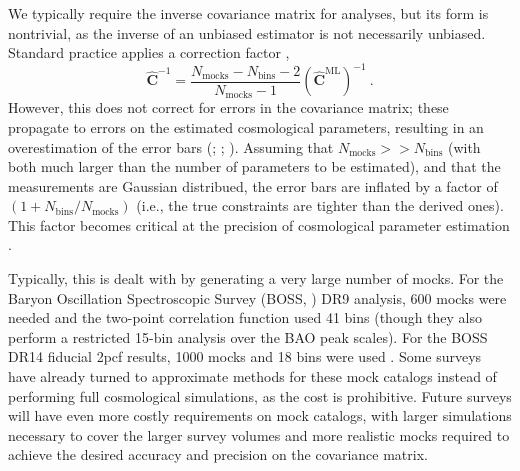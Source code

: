 \documentclass[modern]{aastex62}
\newcommand{\cf}{2pcf\xspace} %
\newcommand{\inv}{^{-1}}
\newcommand{\bld}[1]{\bm{#1}} %
\newcommand{\NN}[1]{N_\mathrm{#1}}
\newcommand{\KSF}[1]{\textcolor{teal}{KSF says: #1}}
\begin{document}
We typically require the inverse covariance matrix for analyses, but its form is nontrivial, as the inverse of an unbiased estimator is not necessarily unbiased.
Standard practice applies a correction factor \citep{Hartlap2007},
\begin{equation}
\bld{\hat{C}}\inv = \frac{\NN{mocks}-\NN{bins}-2}{\NN{mocks}-1} \left( \bld{\hat{C}}^\mathrm{ML} \right) \inv ~.
\end{equation}
However, this does not correct for errors in the covariance matrix; these propagate to errors on the estimated cosmological parameters, resulting in an overestimation of the error bars (\citealt{Hartlap2007}; \citealt{Dodelson2013} \citealt{Percival2014}; \citealt{TaylorJoachimi2014}).
Assuming that $\NN{mocks} >> \NN{bins}$ (with both much larger than the number of parameters to be estimated), and that the measurements are Gaussian distribued, the error bars are inflated by a factor of $(1 + \NN{bins}/\NN{mocks})$ (i.e., the true constraints are tighter than the derived ones).
This factor becomes critical at the precision of cosmological parameter estimation \citep{Percival2014}.

Typically, this is dealt with by generating a very large number of mocks.
For the Baryon Oscillation Spectroscopic Survey (BOSS, \citealt{Dawson2013}) DR9 analysis, 600 mocks were needed and the two-point correlation function used 41 bins \citep{Sanchez2012} (though they also perform a restricted 15-bin analysis over the BAO peak scales). 
For the BOSS DR14 fiducial \cf results, 1000 mocks and 18 bins were used \cite{Ata2017}.
Some surveys have already turned to approximate methods for these mock catalogs instead of performing full cosmological simulations, as the cost is prohibitive.
Future surveys will have even more costly requirements on mock catalogs, with larger simulations necessary to cover the larger survey volumes and more realistic mocks required to achieve the desired accuracy and precision on the covariance matrix.

\end{document}
